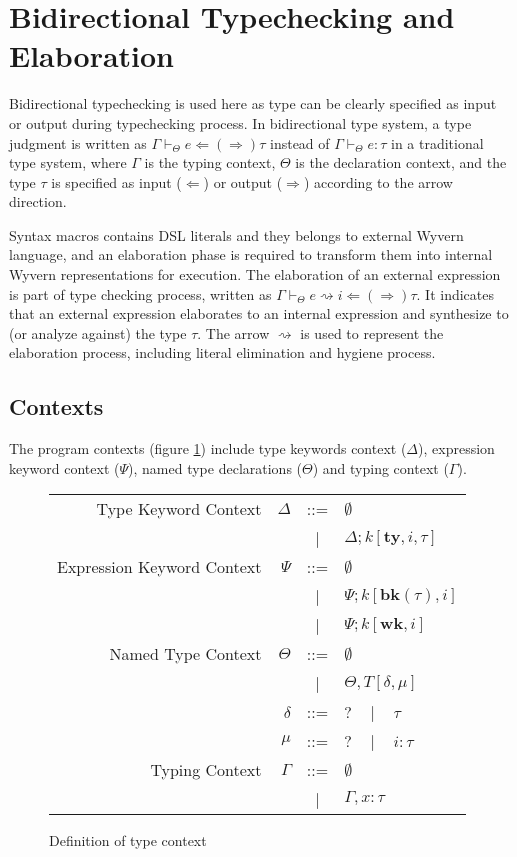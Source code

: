 \documentclass{sig-alternate}
\newcommand{\mycaption}[1]{\vspace{-4px}\caption{#1}\vspace{-2px}}
\begin{document}
\section{Bidirectional Typechecking and Elaboration}
Bidirectional typechecking is used here as type can be clearly specified as input or output during typechecking process. In bidirectional type system, a type judgment is written as $\Gamma\vdash_{\Theta} e\Leftarrow(\Rightarrow)\tau$ instead of $\Gamma\vdash_{\Theta} e:\tau$ in a traditional type system, where $\Gamma$ is the typing context, $\Theta$ is the declaration context, and the type $\tau$ is specified as input ($\Leftarrow$) or output ($\Rightarrow$) according to the arrow direction. 

Syntax macros contains DSL literals and they belongs to external Wyvern language, and an elaboration phase is required to transform them into internal Wyvern representations for execution. The elaboration of an external expression is part of type checking process, written as $\Gamma\vdash_{\Theta} e\rightsquigarrow i \Leftarrow(\Rightarrow) \tau$. It indicates that an external expression elaborates to an internal expression and synthesize to (or analyze against) the type $\tau$. The arrow $\rightsquigarrow$ is used to represent the elaboration process, including literal elimination and hygiene process.

\subsection{Contexts}
The program contexts (figure \ref{typechecking-environment}) include type keywords context ($\Delta$), expression keyword context ($\Psi$), named type declarations ($\Theta$) and typing context ($\Gamma$). 

\begin{figure}[ht]
\begin{center}
\begin{tabular}{r r c l}
Type Keyword Context & $\Delta$ & ::= & $\emptyset$\\
              &                 &  |  & $\Delta;k[\mathbf{ty},i,\tau]$\\
Expression Keyword Context & $\Psi$    & ::= & $\emptyset$\\
            &                 &   |  & $\Psi;k[\mathbf{bk}(\tau),i]$\\
            &                 &   |  & $\Psi;k[\mathbf{wk},i]$\\
Named Type Context  & $\Theta$        & ::= & $\emptyset$\\
              &                 &  |  & $\Theta,T[\delta,\mu]$\\
              & $\delta$        & ::= & $?$ ~ | ~ $\tau$\\
   & $\mu$           & ::= & $?$ ~ | ~ $i:\tau$\\
Typing Context & $\Gamma$ &   ::=  & $\emptyset$\\
                 &          &     |  & $\Gamma,x:\tau$
\end{tabular}
\end{center}
\mycaption{Definition of type context}
\label{typechecking-environment}
\end{figure}
\end{document}
